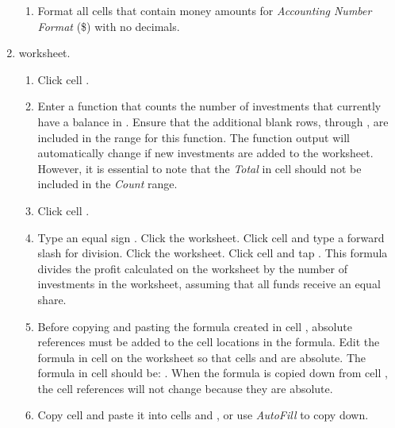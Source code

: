 \begin{enumbox}
\begin{enumerate}
\begin{enumerate}
			\item Format all cells that contain money amounts for \textit{Accounting Number Format} (\$) with no decimals.
		\end{enumerate}
	
		\item {} worksheet.
		
		\begin{enumerate}
			\item Click cell . 
			
			\item Enter a  function that counts the number of investments that currently have a balance in . Ensure that the additional blank rows,  through , are included in the range for this function. The function output will automatically change if new investments are added to the worksheet. However, it is essential to note that the \textit{Total} in cell  should not be included in the \textit{Count} range.
			
			\item Click cell .
			
			\item Type an equal sign \fmtTyping{=}. Click the  worksheet. Click cell  and type a forward slash \fmtTyping{/} for division. Click the  worksheet. Click cell  and tap . This formula divides the profit calculated on the  worksheet by the number of investments in the  worksheet, assuming that all funds receive an equal share.
			
			\item Before copying and pasting the formula created in cell , absolute references must be added to the cell locations in the formula. Edit the formula in cell  on the  worksheet so that cells  and  are absolute. The formula in cell  should be: . When the formula is copied down from cell , the cell references will not change because they are absolute.
			
			\item Copy cell  and paste it into cells  and , or use \textit{AutoFill} to copy down.
			

\end{enumerate}
\end{enumerate}
\end{enumbox}
